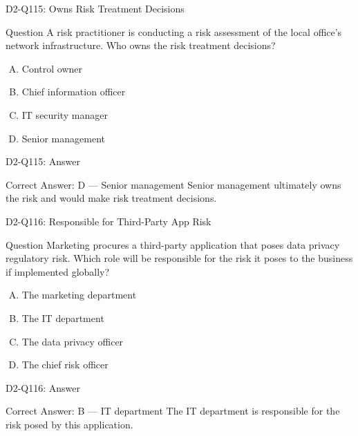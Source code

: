 \documentclass{beamer}
\begin{document}
	\begin{frame}{D2-Q115: Owns Risk Treatment Decisions}
		\begin{block}{Question}
			A risk practitioner is conducting a risk assessment of the local office's network infrastructure. Who owns the risk treatment decisions?
		\end{block}
		\begin{enumerate}[(A)]
			\item Control owner
			\item Chief information officer
			\item IT security manager
			\item Senior management
		\end{enumerate}
	\end{frame}
	\begin{frame}{D2-Q115: Answer}
		\begin{block}{Correct Answer: D --- Senior management}
			Senior management ultimately owns the risk and would make risk treatment decisions.
		\end{block}
	\end{frame}
	
	\begin{frame}{D2-Q116: Responsible for Third-Party App Risk}
		\begin{block}{Question}
			Marketing procures a third-party application that poses data privacy regulatory risk. Which role will be responsible for the risk it poses to the business if implemented globally?
		\end{block}
		\begin{enumerate}[(A)]
			\item The marketing department
			\item The IT department
			\item The data privacy officer
			\item The chief risk officer
		\end{enumerate}
	\end{frame}
	\begin{frame}{D2-Q116: Answer}
		\begin{block}{Correct Answer: B --- IT department}
			The IT department is responsible for the risk posed by this application.
		\end{block}
	\end{frame}
	
\end{document}
